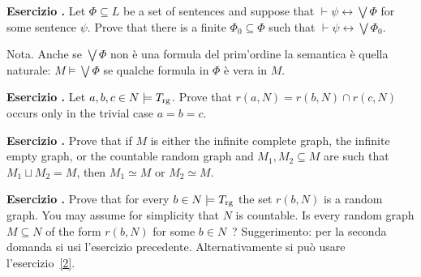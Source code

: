 \documentclass[10pt]{article}
\def\iff{\leftrightarrow}
\newcounter{ex}
\newenvironment{exercise}{\clearpage\addtocounter{ex}{1}\textbf{Esercizio \theex.\quad}}{}
\begin{document}
\clearpage%
\rhead{}\setcounter{ex}{0}


\begin{exercise}
Let $\Phi\subseteq L$ be a set of sentences and suppose that $\vdash\psi\iff\bigvee\Phi$ for some sentence $\psi$. Prove that there is a finite $\Phi_0\subseteq\Phi$ such that  $\vdash\psi\iff\bigvee\Phi_0$.

Nota. Anche se $\bigvee\Phi$ non è una formula del prim'ordine la semantica è quella naturale: $M\models\bigvee\Phi$ se qualche formula in $\Phi$ è vera in $M$.
\end{exercise}

\begin{exercise}\label{2}
Let $a,b,c\in N\models T_{\rm rg}$. Prove that $r(a,N)=r(b,N)\cap r(c,N)$ occurs only in the trivial case $a=b=c$.
\end{exercise}

\begin{exercise}
Prove that if $M$ is either the infinite complete graph, the infinite empty graph, or the countable random graph and $M_1,M_2\subseteq M$ are such that $M_1\sqcup M_2=M$, then $M_1\simeq M$ or $M_2\simeq M$.
\end{exercise}

\begin{exercise}
Prove that for every $b\in N\models T_{\rm rg}$ the set $r(b,N)$ is a random graph. You may assume for simplicity that $N$ is countable. Is every random graph $M\subseteq N$ of the form $r(b,N)$ for some $b\in N$~? Suggerimento: per la seconda domanda si usi l'esercizio precedente. Alternativamente si può usare l'esercizio~\ref{2}.
\end{exercise}
\end{document}
